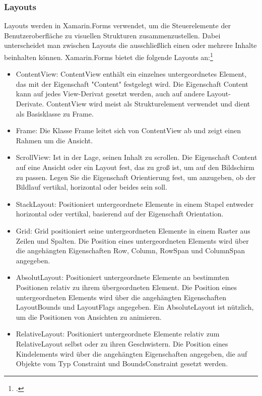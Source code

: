 \begin{minipage}{\linewidth}

\end{minipage}


\subsubsection{Layouts}

Layouts werden in Xamarin.Forms verwendet, um die Steuerelemente der Benutzeroberfläche zu visuellen Strukturen zusammenzustellen. Dabei unterscheidet man zwischen Layouts die ausschließlich einen oder mehrere Inhalte beinhalten können.  Xamarin.Forms bietet die folgende Layouts an:\footcite[Vgl.][Abgerufen am \today]{MicrosoftXamLayouts2018} 


\begin{itemize}
\setlength\itemsep{-0.6em}
 \item ContentView: ContentView enthält ein einzelnes untergeordnetes Element, das mit der Eigenschaft "Content" festgelegt wird. Die Eigenschaft Content kann auf jedes View-Derivat gesetzt werden, auch auf andere Layout-Derivate. ContentView wird meist als Strukturelement verwendet und dient als Basisklasse zu Frame.
 \item Frame: Die Klasse Frame leitet sich von ContentView ab und zeigt einen Rahmen um die Ansicht.
  \item ScrollView: Ist in der Lage, seinen Inhalt zu scrollen.  Die Eigenschaft Content auf eine Ansicht oder ein Layout fest, das zu groß ist, um auf den Bildschirm zu passen.  Legen Sie die Eigenschaft Orientierung fest, um anzugeben, ob der Bildlauf vertikal, horizontal oder beides sein soll.
 \item StackLayout: Positioniert untergeordnete Elemente in einem Stapel entweder horizontal oder vertikal, basierend auf der Eigenschaft Orientation.
 \item Grid: Grid positioniert seine untergeordneten Elemente in einem Raster aus Zeilen und Spalten. Die Position eines untergeordneten Elements wird über die angehängten Eigenschaften Row, Column, RowSpan und ColumnSpan angegeben.
 \item AbsolutLayout: Positioniert untergeordnete Elemente an bestimmten Positionen relativ zu ihrem übergeordneten Element. Die Position eines untergeordneten Elements wird über die angehängten Eigenschaften LayoutBounds und LayoutFlags angegeben. Ein AbsoluteLayout ist nützlich, um die Positionen von Ansichten zu animieren.
 \item RelativeLayout:  Positioniert untergeordnete Elemente relativ zum RelativeLayout selbst oder zu ihren Geschwistern. Die Position eines Kindelements wird über die angehängten Eigenschaften angegeben, die auf Objekte vom Typ Constraint und BoundsConstraint gesetzt werden.
\end{itemize}

